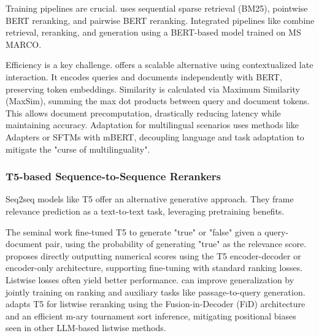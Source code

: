 \documentclass[runningheads]{llncs}
\begin{document}
Training pipelines are crucial. \cite{nogueira2019multistagedocumentrankingbert} uses sequential sparse retrieval (BM25), pointwise BERT reranking, and pairwise BERT reranking. Integrated pipelines like \cite{glass2022re2gretrievererankgenerate} combine retrieval, reranking, and generation using a BERT-based model trained on MS MARCO\cite{bajaj2018msmarcohumangenerated}.

Efficiency is a key challenge. \cite{khattab2020colbertefficienteffectivepassage} offers a scalable alternative using contextualized late interaction. It encodes queries and documents independently with BERT, preserving token embeddings. Similarity is calculated via Maximum Similarity (MaxSim), summing the max dot products between query and document tokens. This allows document precomputation, drastically reducing latency while maintaining accuracy. Adaptation for multilingual scenarios uses methods like Adapters or SFTMs\cite{litschko2022parameterefficientneuralrerankingcrosslingual} with mBERT, decoupling language and task adaptation to mitigate the "curse of multilinguality"\cite{chang2023multilingualitycurselanguagemodeling}.

\subsubsection{T5-based Sequence-to-Sequence Rerankers}
Seq2seq models like T5\cite{raffel2023exploringlimitstransferlearning} offer an alternative generative approach. They frame relevance prediction as a text-to-text task, leveraging pretraining benefits.

The seminal work \cite{nogueira2020documentrankingpretrainedsequencetosequence} fine-tuned T5 to generate "true" or "false" given a query-document pair, using the probability of generating "true" as the relevance score. \cite{zhuang2022rankt5finetuningt5text} proposes directly outputting numerical scores using the T5 encoder-decoder or encoder-only architecture, supporting fine-tuning with standard ranking losses. Listwise losses often yield better performance. \cite{ju2022texttotextmultiviewlearningpassage} can improve generalization by jointly training on ranking and auxiliary tasks like passage-to-query generation. \cite{yoon2024listt5listwisererankingfusionindecoder} adapts T5 for listwise reranking using the Fusion-in-Decoder (FiD) architecture and an efficient m-ary tournament sort inference, mitigating positional biases seen in other LLM-based listwise methods\cite{liu2023lostmiddlelanguagemodels}.
\end{document}
